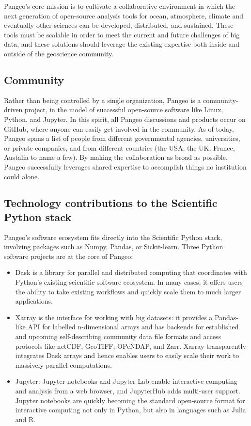\documentclass{article}
\begin{document}
Pangeo's core mission is to cultivate a collaborative environment in which the
next generation of open-source analysis tools for ocean, atmosphere, climate and
eventually other sciences can be developed, distributed, and sustained. These
tools must be scalable in order to meet the current and future challenges of big
data, and these solutions should leverage the existing expertise both inside and
outside of the geoscience community.

\subsection{Community}
\label{ssec:community}

Rather than being controlled by a single organization, Pangeo is a
community-driven project, in the model of successful open-source software like
Linux, Python, and Jupyter. In this spirit, all Pangeo discussions and products
occur on GitHub\cite{b3}, where anyone can easily get involved in the community.
As of today, Pangeo spans a list of people from different governmental agencies,
universities, or private companies, and from different countries (the USA, the
UK, France, Austalia to name a few). By making the collaboration as broad as
possible, Pangeo successfully leverages shared expertise to accomplish things no
institution could alone.


\subsection{Technology contributions to the Scientific Python stack}
\label{ssec:techstack}

Pangeo's software ecosystem fits directly into the Scientific Python stack, involving packages such as Numpy, Pandas, or Sickit-learn.  Three Python software projects are at the core of Pangeo:
\begin{itemize}
\item Dask is a library for parallel and distributed computing that coordinates with Python’s existing scientific software ecosystem. In many cases, it offers users the ability to take existing workflows and quickly scale them to much larger applications.
\item Xarray is the interface for working with big datasets: it provides a Pandas-like API for labelled n-dimensional arrays and has backends for established and upcoming self-describing community data file formats and access protocols like netCDF, GeoTIFF, OPeNDAP, and Zarr. Xarray transparently integrates Dask arrays and hence enables users to easily scale their work to massively parallel computations.
\item Jupyter: Jupyter notebooks and Jupyter Lab enable interactive computing and analysis from a web browser, and JupyterHub adds multi-user support. Jupyter notebooks are quickly becoming the standard open-source format for interactive computing not only in Python, but also in languages such as Julia and R.
\end{itemize}
\end{document}
